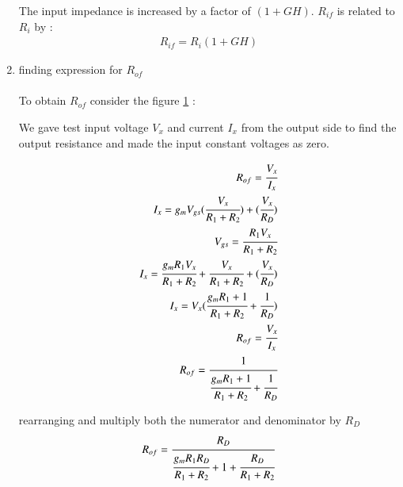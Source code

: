 \begin{enumerate}[label=\thesubsection.\arabic*.,ref=\thesubsection.\theenumi]
The input impedance is increased by a factor of $(1+GH)$.
$R_{if}$ is related to $R_{i}$ by :\\
\begin{align}
R_{if} = R_{i}(1 + GH)
\end{align}



\begin{figure}[ht!]
	\begin{center}
		\resizebox{\columnwidth}{!}{}
	\end{center}
	\caption{}
	\label{fig:Small signal for finding output resistance}
\end{figure}

\item finding expression for $R_{of}$\\
\solution\\

To obtain $R_{of}$ consider the figure \ref{fig:Small signal for finding output resistance} :



We gave test input voltage $V_{x}$ and current $I_{x}$ from the output side to find the output resistance and made the input constant voltages as zero.

\begin{align}
R_{of} = \cfrac{V_{x}}{I_{x}}\\
I_{x} = g_{m}V_{gs}(\cfrac{V_{x}}{R_{1}+R_{2}})+(\cfrac{V_{x}}{R_{D}})\\
V_{gs} = \cfrac{R_{1}V_{x}}{R_{1}+R_{2}}\\
I_{x} = \cfrac{g_{m}R_{1}V_{x}}{R_{1}+R_{2}}+\cfrac{V_{x}}{R_{1}+R_{2}}+(\cfrac{V_{x}}{R_{D}})\\
I_{x} = V_{x}(\cfrac{g_{m}R_{1}+1}{R_{1}+R_{2}} + \cfrac{1}{R_{D}})\\
R_{of} = \cfrac{V_{x}}{I_{x}}\\ R_{of} = \cfrac{1}{\cfrac{g_{m}R_{1}+1}{R_{1}+R_{2}}+\cfrac{1}{R_{D}}}
\end{align}



rearranging and multiply both the numerator and denominator by $R_{D}$\\

\begin{align}
R_{of} = \cfrac{R_{D}}{\cfrac{g_{m}R_{1}R_{D}}{R_{1}+R_{2}}+1+\cfrac{R_{D}}{R_{1}+R_{2}}}
\end{align}


\end{enumerate}
